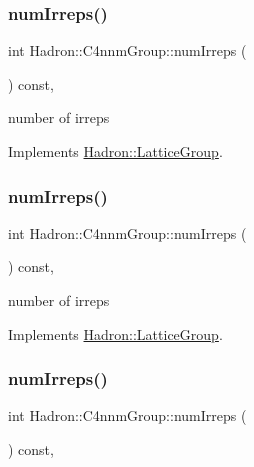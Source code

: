 \subsubsection{\texorpdfstring{numIrreps()}{numIrreps()}\hspace{0.1cm}{\footnotesize\ttfamily [1/3]}}
{\footnotesize\ttfamily int Hadron\+::\+C4nnm\+Group\+::num\+Irreps (\begin{DoxyParamCaption}{ }\end{DoxyParamCaption}) const\hspace{0.3cm}{\ttfamily [inline]}, {\ttfamily [virtual]}}

number of irreps 

Implements \mbox{\hyperlink{structHadron_1_1LatticeGroup_a3edaca488144b5d2a9cf73fe653add34}{Hadron\+::\+Lattice\+Group}}.

\mbox{\label{structHadron_1_1C4nnmGroup_a70b7d429c62a7f1b2ed77cbc3566ea42}} 
\subsubsection{\texorpdfstring{numIrreps()}{numIrreps()}\hspace{0.1cm}{\footnotesize\ttfamily [2/3]}}
{\footnotesize\ttfamily int Hadron\+::\+C4nnm\+Group\+::num\+Irreps (\begin{DoxyParamCaption}{ }\end{DoxyParamCaption}) const\hspace{0.3cm}{\ttfamily [inline]}, {\ttfamily [virtual]}}

number of irreps 

Implements \mbox{\hyperlink{structHadron_1_1LatticeGroup_a3edaca488144b5d2a9cf73fe653add34}{Hadron\+::\+Lattice\+Group}}.

\mbox{\label{structHadron_1_1C4nnmGroup_a70b7d429c62a7f1b2ed77cbc3566ea42}} 
\subsubsection{\texorpdfstring{numIrreps()}{numIrreps()}\hspace{0.1cm}{\footnotesize\ttfamily [3/3]}}
{\footnotesize\ttfamily int Hadron\+::\+C4nnm\+Group\+::num\+Irreps (\begin{DoxyParamCaption}{ }\end{DoxyParamCaption}) const\hspace{0.3cm}{\ttfamily [inline]}, {\ttfamily [virtual]}}

